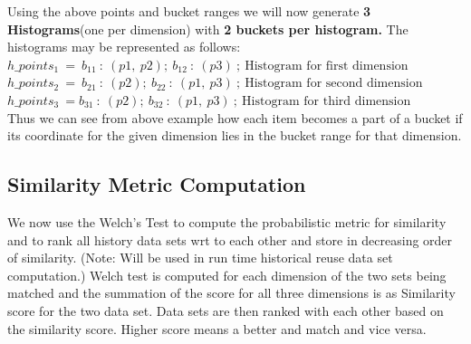 Using the above points and bucket ranges we will now generate \textbf{3 Histograms}(one per dimension) with \textbf{2 buckets per histogram.} The histograms may be represented as follows: \\
$h\_points_1\ =\ {b_{11}\ :\  (p1,\  p2);\ b_{12}\ :\  (p3)\ };\ \text{Histogram for first dimension}$\\
$h\_points_2\ =\ {b_{21}\ :\  (p2);\ b_{22}\ :\  (p1, \ p3)\ };\ \text{Histogram for second dimension}$\\
$h\_points_3\ =  {b_{31}\ :\  (p2);\ b_{32}\ :\  (p1, \ p3)\ };\ \text{Histogram for third dimension}$\\

Thus we can see from above example how each item becomes a part of a bucket if its coordinate for the given dimension lies in the bucket range for that dimension.

\subsection{Similarity Metric Computation}
\label{similarity_metric_calculation}
We now use the Welch's Test \cite{welch_test}\cite{boost_graph} to compute the probabilistic metric for similarity and to rank all history data sets wrt to each other and store in decreasing order of similarity. (Note: Will be used in run time historical reuse data set computation.) 
Welch test is computed for each dimension of the two sets being matched and the summation of the score for all three dimensions is as Similarity score for the two data set. Data sets are then ranked with each other based on the similarity score. Higher score means a better and match and vice versa.
